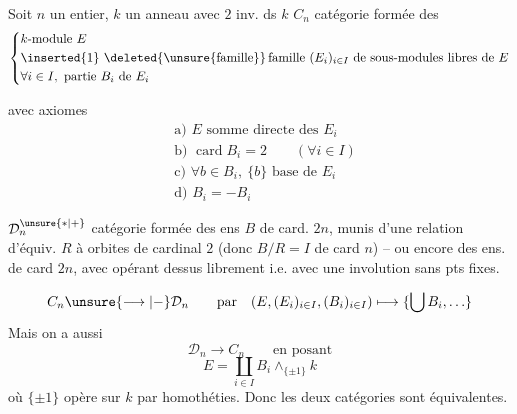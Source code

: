 Soit $n$ un entier, $k$ un anneau  avec $2$ inv. ds $k$
$C_n$ catégorie formée des
\[
\left\{\begin{aligned}
& k\text{-module }E\\
& \inserted{1}\ \deleted{\unsure{\text{famille}}}\,\text{famille }(E_i)_{i\in I}\ \text{de sous-modules libres de }E\\
& \forall i\in I,\ \text{partie } B_i\text{ de }E_i
\end{aligned}\right.
\]

avec axiomes
\[
\begin{aligned}
&\text{a) } E\text{ somme directe des } E_i\\
&\text{b) }\operatorname{card} B_i=2\qquad(\forall i\in I)\\
&\text{c) }\forall b\in B_i,\ \{b\}\text{ base de } E_i\\
&\text{d) }B_i=-B_i
\end{aligned}
\]

$\mathcal D_n^{\unsure{*|+}}$ catégorie formée des ens $B$ de card. $2n$,
munis d'une relation d'équiv. $R$ à orbites
de cardinal $2$ (donc $B/R=I$ de card $n$)
-- ou encore des ens. de card $2n$, avec
  opérant dessus librement i.e. avec une
involution sans pts fixes.

\[
 C_n\unsure{\longrightarrow|-}\mathcal D_n\qquad\text{par}\quad
 (E,(E_i)_{i\in I},(B_i)_{i\in I})\longmapsto\{\bigcup B_i,\ldots\}
\]
Mais on a aussi
\[
 \mathcal D_n\longrightarrow C_n\qquad\text{en posant}
\]
\[
 E=\coprod_{i\in I}B_i\wedge_{\{\pm1\}}k
\]
où $\{\pm1\}$ opère sur $k$ par homothéties. Donc les
deux catégories sont équivalentes.
